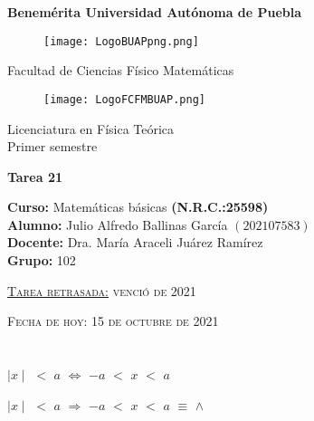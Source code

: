 \documentclass[12pt]{article}
\begin{document}
\pagestyle{empty} 
\setlength{\parindent}{0pt}
\sffamily
\begin{center} \LARGE{\bf Benemérita Universidad Autónoma de Puebla} \\[0.5cm]
\begin{figure}[htb] \centering \texttt{[image: LogoBUAPpng.png]} \end{figure}
\LARGE{Facultad de Ciencias Físico Matemáticas}\\[0.5cm]
\begin{figure}[htb] \centering \texttt{[image: LogoFCFMBUAP.png]} \end{figure} 
\Large{Licenciatura en Física Teórica}\\[0.5cm]
\large{Primer semestre} \end{center}
\begin{center} { \Large \bfseries{Tarea 21}} \\ \end{center}
\large{\bf Curso:} Matemáticas básicas \textbf{(N.R.C.:25598)}\\
\large{\bf Alumno:} Julio Alfredo Ballinas García $\left(202107583\right)$ \\
\large{\bf Docente:} Dra. María Araceli Juárez Ramírez\\
\large{\bf Grupo:} 102\\ \begin{center} 
\vfill
\textsc{\underline{Tarea retrasada:} venció {} de 2021} \end{center}
\begin{center}
\textsc{Fecha de hoy: 15 de octubre de 2021}
\end{center}
\newpage

\section*{}  \vspace{.5cm}

{\LARGE{{} \hspace{.1cm} $\mid x \mid$ $<$ $a$ $\Longleftrightarrow$ $-a$ $<$ $x$ $<$ $a$}} \vspace{.5cm}


{} {{\Large{$\mid x\mid$ $<$ $a$ $\Longrightarrow$ $-a$ $<$ $x$ $<$ $a$ $\equiv$ {} $\wedge$ {}}}}   \vspace{0.5cm}
\end{document}
